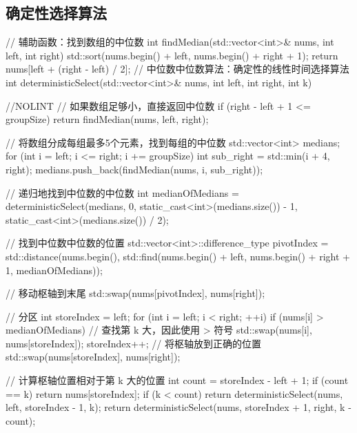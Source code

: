 \subsection{确定性选择算法}
\begin{cppcode}
// 辅助函数：找到数组的中位数
int findMedian(std::vector<int>& nums, int left, int right) {
    std::sort(nums.begin() + left, nums.begin() + right + 1);
    return nums[left + (right - left) / 2];
}
// 中位数中位数算法：确定性的线性时间选择算法
int deterministicSelect(std::vector<int>& nums, int left, int right, int k) { //NOLINT
    // 如果数组足够小，直接返回中位数
    if (right - left + 1 <= groupSize) {
        return findMedian(nums, left, right);
    }

    // 将数组分成每组最多5个元素，找到每组的中位数
    std::vector<int> medians;
    for (int i = left; i <= right; i += groupSize) {
        int sub_right = std::min(i + 4, right);
        medians.push_back(findMedian(nums, i, sub_right));
    }

    // 递归地找到中位数的中位数
    int medianOfMedians = deterministicSelect(medians, 0, static_cast<int>(medians.size()) - 1, static_cast<int>(medians.size()) / 2);

    // 找到中位数中位数的位置
    std::vector<int>::difference_type pivotIndex = std::distance(nums.begin(), std::find(nums.begin() + left, nums.begin() + right + 1, medianOfMedians));

    // 移动枢轴到末尾
    std::swap(nums[pivotIndex], nums[right]);

    // 分区
    int storeIndex = left;
    for (int i = left; i < right; ++i) {
        if (nums[i] > medianOfMedians) { // 查找第 k 大，因此使用 > 符号
            std::swap(nums[i], nums[storeIndex]);
            storeIndex++;
        }
    }
    // 将枢轴放到正确的位置
    std::swap(nums[storeIndex], nums[right]);

    // 计算枢轴位置相对于第 k 大的位置
    int count = storeIndex - left + 1;
    if (count == k) {
        return nums[storeIndex];
    }
    if (k < count) {
        return deterministicSelect(nums, left, storeIndex - 1, k);
    }
    return deterministicSelect(nums, storeIndex + 1, right, k - count);
}
\end{cppcode}

